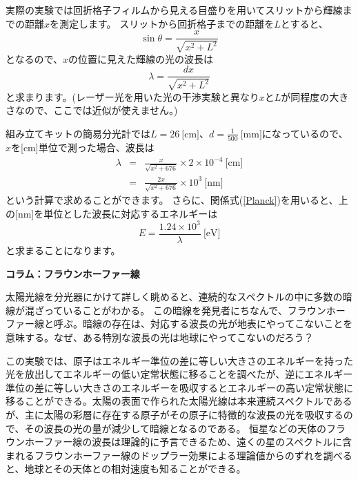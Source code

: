 実際の実験では回折格子フィルムから見える目盛りを用いてスリットから輝線までの距離$x$を測定します。
スリットから回折格子までの距離を$L$とすると、
\[
\sin \theta  = \frac{x}{\sqrt{x^2+L^2}}
\]
となるので、$x$の位置に見えた輝線の光の波長は
\[
\lambda = \frac{d x}{\sqrt{x^2+L^2}}
\]
と求まります。(レーザー光を用いた光の干渉実験と異なり$x$と$L$が同程度の大きさなので、ここでは近似が使えません。)

組み立てキットの簡易分光計では$L=26~\text{[cm]}$、$d=\frac{1}{500}~\text{[mm]}$になっているので、$x$を[cm]単位で測った場合、波長は
\begin{eqnarray}
\lambda &=& \frac{x}{\sqrt{x^2+676}}\times 2\times10^{-4} ~\text{[cm]}\nonumber\\
&=& \frac{2x}{\sqrt{x^2+676}}\times 10^{3}  ~\text{[nm]} \nonumber
\end{eqnarray}
という計算で求めることができます。
さらに、関係式(\ref{Planck})を用いると、上の[nm]を単位とした波長に対応するエネルギーは
\[
E=\frac{1.24 \times 10^{3}}{\lambda} ~\text{[eV]}
\]
と求まることになります。

\begin{itembox}[l]{\bf コラム：フラウンホーファー線}

太陽光線を分光器にかけて詳しく眺めると、連続的なスペクトルの中に多数の暗線が混ざっていることがわかる。
この暗線を発見者にちなんで、フラウンホーファー線と呼ぶ。暗線の存在は、対応する波長の光が地表にやってこないことを意味する。なぜ、ある特別な波長の光は地球にやってこないのだろう？

この実験では、原子はエネルギー準位の差に等しい大きさのエネルギーを持った光を放出してエネルギーの低い定常状態に移ることを調べたが、逆にエネルギー準位の差に等しい大きさのエネルギーを吸収するとエネルギーの高い定常状態に移ることができる。太陽の表面で作られた太陽光線は本来連続スペクトルであるが、主に太陽の彩層に存在する原子がその原子に特徴的な波長の光を吸収するので、その波長の光の量が減少して暗線となるのである。
恒星などの天体のフラウンホーファー線の波長は理論的に予言できるため、遠くの星のスペクトルに含まれるフラウンホーファー線のドップラー効果による理論値からのずれを調べると、地球とその天体との相対速度も知ることができる。

\end{itembox}

